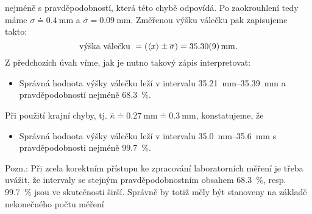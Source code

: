 \begin{example}
  nejméně s pravděpodobností, která této chybě odpovídá. Po zaokrouhlení tedy máme \(\sigma \doteq 
  \SI{0.4}{\mm}\) a \(\overline{\sigma} = \SI{0.09}{\mm}\). Změřenou výšku válečku pak zapisujeme 
  takto:
  \begin{equation*}
    \text{výška válečku } = (\langle x \rangle\pm \overline{\sigma}) = \SI{35.30 \pm 0.09}{\mm}.
  \end{equation*}
  Z předchozích úvah víme, jak je nutno takový zápis interpretovat:
  \begin{itemize}
    \item Správná hodnota výšky válečku leží v intervalu \SIrange[range-units =   
          brackets]{35.21}{35.39}{\mm} a pravděpodobností nejméně \SI{68.3}{\percent}.
  \end{itemize}
  Při použití krajní chyby, tj. \(\overline{\kappa} \doteq \SI{0.27}{\mm} \doteq \SI{0.3}{\mm}\), 
  konstatujeme, že
  \begin{itemize}
    \item Správná hodnota výšky válečku leží v intervalu \SIrange[range-units = 
          brackets]{35.0}{35.6}{\mm} s pravděpodobnosti nejméně \SI{99.7}{\percent}.
  \end{itemize}
  Pozn.: Při zcela korektním přístupu ke zpracování laboratorních měření je třeba uvážit, že 
  intervaly se stejným pravděpodobnostním obsahem \SI{68.3}{\percent}, resp. \SI{99.7}{\percent} 
  jsou ve skutečnosti širší. Správně by totiž měly být stanoveny na základě nekonečného počtu měření
\normalsize
\end{example}